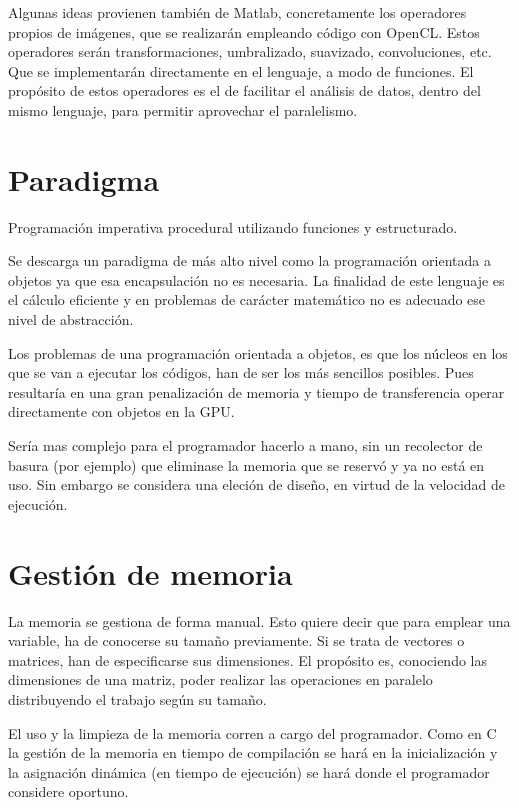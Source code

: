 \documentclass[12pt,a4paper]{article}
\begin{document}
Algunas ideas provienen también de Matlab, concretamente los operadores propios 
de imágenes, que se realizarán empleando código con OpenCL. Estos operadores 
serán transformaciones, umbralizado, suavizado, convoluciones, etc. Que se 
implementarán directamente en el lenguaje, a modo de funciones. El propósito de 
estos operadores es el de facilitar el análisis de datos, dentro del mismo 
lenguaje, para permitir aprovechar el paralelismo.



\section{Paradigma}
Programación imperativa procedural utilizando funciones y estructurado.

Se descarga un paradigma de más alto nivel como la programación orientada a 
objetos ya que esa encapsulación no es necesaria. La finalidad de este lenguaje 
es el cálculo eficiente y en problemas de carácter matemático no es adecuado ese 
nivel de abstracción.

Los problemas de una programación orientada a objetos, es que los núcleos en los 
que se van a ejecutar los códigos, han de ser los más sencillos posibles. Pues 
resultaría en una gran penalización de memoria y tiempo de transferencia operar 
directamente con objetos en la GPU.

Sería mas complejo para el programador hacerlo a mano, sin un recolector de 
basura (por ejemplo) que eliminase la memoria que se reservó y ya no está en 
uso. Sin embargo se considera una eleción de diseño, en virtud de la velocidad 
de ejecución.



\section{Gestión de memoria}
La memoria se gestiona de forma manual. Esto quiere decir que para emplear una 
variable, ha de conocerse su tamaño previamente. Si se trata de vectores o 
matrices, han de especificarse sus dimensiones. El propósito es, conociendo las 
dimensiones de una matriz, poder realizar las operaciones en paralelo 
distribuyendo el trabajo según su tamaño.

El uso y la limpieza de la memoria corren a cargo del programador. Como en C la 
gestión de la memoria en tiempo de compilación se hará en la inicialización y la 
asignación dinámica (en tiempo de ejecución) se hará donde el programador 
considere oportuno.
\end{document}
